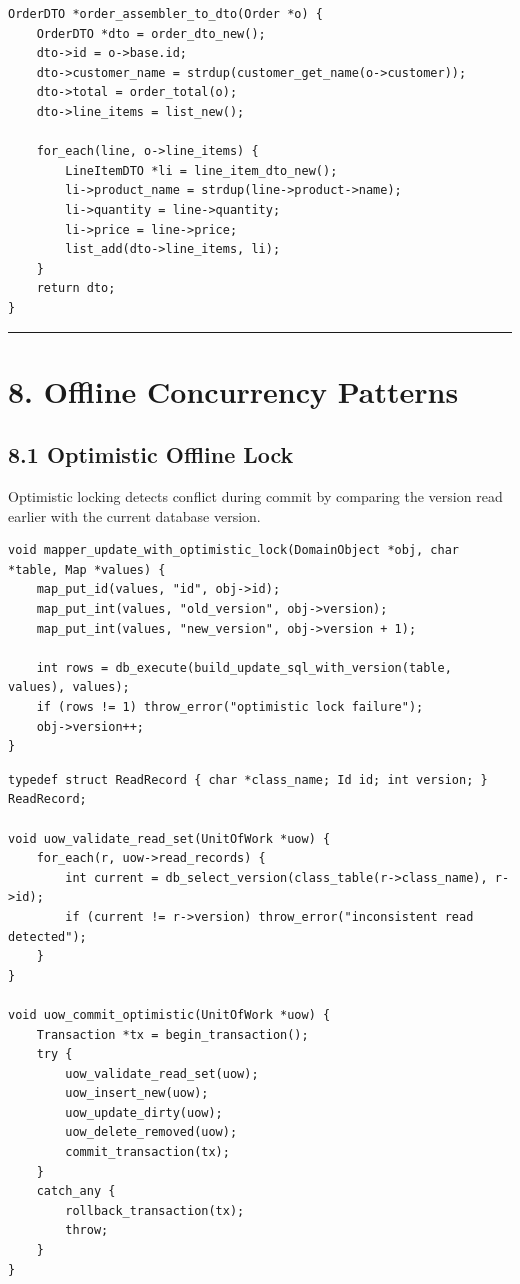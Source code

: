 \documentclass[11pt]{article}
\begin{document}
\begin{verbatim}
OrderDTO *order_assembler_to_dto(Order *o) {
    OrderDTO *dto = order_dto_new();
    dto->id = o->base.id;
    dto->customer_name = strdup(customer_get_name(o->customer));
    dto->total = order_total(o);
    dto->line_items = list_new();

    for_each(line, o->line_items) {
        LineItemDTO *li = line_item_dto_new();
        li->product_name = strdup(line->product->name);
        li->quantity = line->quantity;
        li->price = line->price;
        list_add(dto->line_items, li);
    }
    return dto;
}
\end{verbatim}

\begin{center}\rule{0.5\linewidth}{0.5pt}\end{center}

\section{8. Offline Concurrency
Patterns}\label{offline-concurrency-patterns}

\subsection{8.1 Optimistic Offline Lock}\label{optimistic-offline-lock}

Optimistic locking detects conflict during commit by comparing the
version read earlier with the current database version.

\begin{verbatim}
void mapper_update_with_optimistic_lock(DomainObject *obj, char *table, Map *values) {
    map_put_id(values, "id", obj->id);
    map_put_int(values, "old_version", obj->version);
    map_put_int(values, "new_version", obj->version + 1);

    int rows = db_execute(build_update_sql_with_version(table, values), values);
    if (rows != 1) throw_error("optimistic lock failure");
    obj->version++;
}
\end{verbatim}

\begin{verbatim}
typedef struct ReadRecord { char *class_name; Id id; int version; } ReadRecord;

void uow_validate_read_set(UnitOfWork *uow) {
    for_each(r, uow->read_records) {
        int current = db_select_version(class_table(r->class_name), r->id);
        if (current != r->version) throw_error("inconsistent read detected");
    }
}

void uow_commit_optimistic(UnitOfWork *uow) {
    Transaction *tx = begin_transaction();
    try {
        uow_validate_read_set(uow);
        uow_insert_new(uow);
        uow_update_dirty(uow);
        uow_delete_removed(uow);
        commit_transaction(tx);
    }
    catch_any {
        rollback_transaction(tx);
        throw;
    }
}
\end{verbatim}
\end{document}
